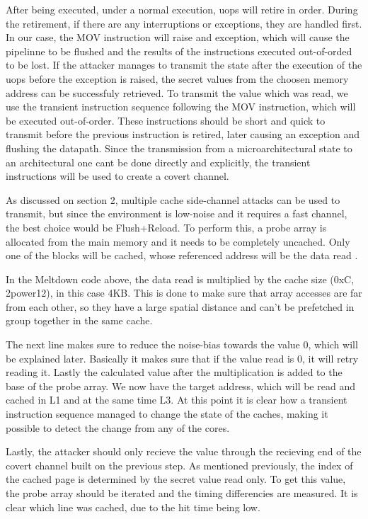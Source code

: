 \documentclass[sigconf]{acmart}
\begin{document}
After being executed, under a normal execution, uops will retire in order. During the retirement, if there are any interruptions or exceptions, they are handled first. In our case, the MOV instruction will raise and exception, which will cause the pipelinne to be flushed and the results of the instructions executed out-of-orded to be lost. If the attacker manages to transmit the state after the execution of the uops before the exception is raised, the secret values from the choosen memory address can be successfuly retrieved. To transmit the value which was read, we use the transient instruction sequence following the MOV instruction, which will be executed out-of-order. These instructions should be short and quick to transmit before the previous instruction is retired, later causing an exception and flushing the datapath. Since the transmission from a microarchitectural state to an architectural one cant be done directly and explicitly, the transient instructions will be used to create a covert channel.

As discussed on section 2, multiple cache side-channel attacks can be used to transmit, but since the environment is low-noise and it requires a fast channel, the best choice would be Flush+Reload. To perform this, a probe array is allocated from the main memory and it needs to be completely uncached. Only one of the blocks will be cached, whose referenced address will be the data read .

In the Meltdown code above, the data read is multiplied by the cache size (0xC, 2power12), in this case 4KB. This is done to make sure that array accesses are far from each other, so they have a large spatial distance and can't be prefetched in group together in the same cache. 

The next line makes sure to reduce the noise-bias towards the value 0, which will be explained later. Basically it makes sure that if the value read is 0, it will retry reading it. Lastly the calculated value after the multiplication is added to the base of the probe array. We now have the target address, which will be read and cached in L1 and at the same time L3. At this point it is clear how a transient instruction sequence managed to change the state of the caches, making it possible to detect the change from any of the cores. 

Lastly, the attacker should only recieve the value through the recieving end of the covert channel built on the previous step. As mentioned previously, the index of the cached page is determined by the secret value read only. To get this value, the probe array should be iterated and the timing differencies are measured. It is clear which line was cached, due to the hit time being low. 
\end{document}
